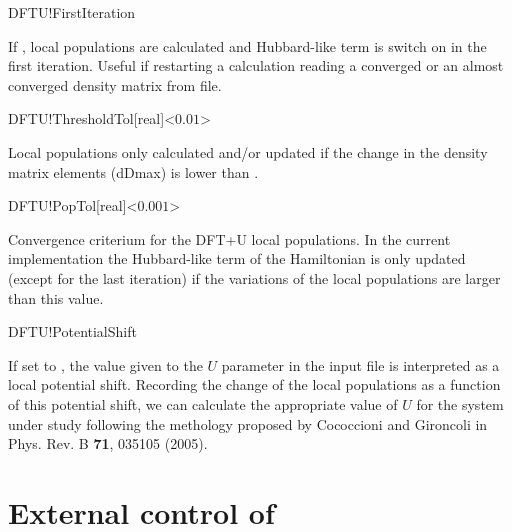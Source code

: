 \begin{fdflogicalF}{DFTU!FirstIteration}

  If \fdftrue, local populations are calculated and Hubbard-like term
  is switch on in the first iteration.  Useful if restarting a
  calculation reading a converged or an almost converged density
  matrix from file.

\end{fdflogicalF}

\begin{fdfentry}{DFTU!ThresholdTol}[real]<$0.01$>
  
  Local populations only calculated and/or updated if the change in the
  density matrix elements (dDmax) is lower than .

\end{fdfentry}

\begin{fdfentry}{DFTU!PopTol}[real]<$0.001$>

  Convergence criterium for the DFT+U local populations. In the
  current implementation the Hubbard-like term of the Hamiltonian is
  only updated (except for the last iteration) if the variations of
  the local populations are larger than this value.

\end{fdfentry}

\begin{fdflogicalF}{DFTU!PotentialShift}

  If set to \fdftrue, the value given to the $U$ parameter in the
  input file is interpreted as a local potential shift. Recording the
  change of the local populations as a function of this potential
  shift, we can calculate the appropriate value of $U$ for the system
  under study following the methology proposed by Cococcioni and
  Gironcoli in Phys. Rev. B \textbf{71}, 035105 (2005).

\end{fdflogicalF}


\section{External control of \texorpdfstring{\siesta}{SIESTA}}
\label{sec:lua}

